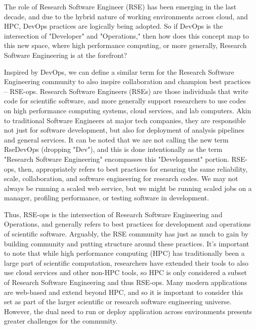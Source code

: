 The role of Research Software Engineer (RSE) has been emerging in the last decade, and due to the hybrid nature of working environments across cloud, and HPC, DevOps practices are logically being adopted. So if DevOps is the intersection of  "Developer" and "Operations," then how does this concept map to this new space, where high performance computing, or more generally, Research Software Engineering is at the forefront?

Inspired by DevOps, we can define a similar term for the Research Software Engineering community to also inspire collaboration and champion best practices -- RSE-ops. Research Software Engineers (RSEs) \cite{rse-history} are those individuals that write code for scientific software, and more generally support researchers to use codes on high performance computing systems, cloud services, and lab computers.
Akin to traditional Software Engineers at major tech companies, they are responsible not just for software development, but also for deployment of analysis pipelines and general services.
It can be noted that we are not calling the new term RseDevOps (dropping "Dev"), and this is done intentionally as the term "Research Software Engineering" encompasses this "Development" portion. RSE-ops, then, appropriately refers to best practices for ensuring the same reliability, scale, collaboration, and software engineering for research codes. We may not always be running a scaled web service, but we might be running scaled jobs on a manager, profiling performance, or testing software in development.

Thus, RSE-ops is the intersection of Research Software Engineering and Operations, and generally refers to best practices for development and operations of scientific software.
Arguably, the RSE community has just as much to gain by building community and putting structure around these practices.
It's important to note that while high performance computing (HPC) has traditionally been a large part of scientific computation, researchers have extended their tools to also use cloud services and other non-HPC tools, so HPC is only considered a subset of Research Software Engineering and thus RSE-ops. Many modern applications are web-based and extend beyond HPC, and so it is important to consider this set as part of the larger scientific or research software engineering universe. However, the dual need to run or deploy application across environments presents greater challenges for the community.  

